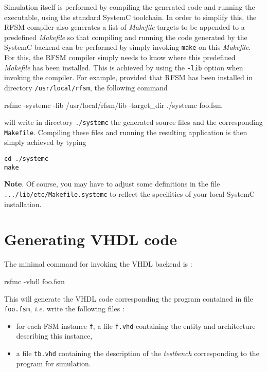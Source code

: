 Simulation itself is performed by compiling the generated code and running the executable,
using the standard SystemC toolchain.
In order to simplify this, the RFSM compiler also generates a list of \emph{Makefile} targets to be
appended to a predefined \emph{Makefile} so that compiling and running the code generated by the
SystemC backend can be performed by simply invoking \verb|make| on this \emph{Makefile}. For this,
the RFSM compiler simply needs to know where this predefined \emph{Makefile} has been
installed. This is achieved by using the \verb|-lib| option when invoking the compiler. For example,
provided that RFSM has been installed in directory \verb|/usr/local/rfsm|, the following command

\begin{FVerbatim}
rsfmc -systemc -lib /usr/local/rfsm/lib -target_dir ./systemc  foo.fsm  
\end{FVerbatim}

will write in directory \verb|./systemc| the generated source files and the corresponding
\verb|Makefile|. Compiling these files and running the resulting application is then simply achieved
by typing

\begin{verbatim}
cd ./systemc
make 
\end{verbatim}

\medskip
\textbf{Note}. Of course, you may have to adjust some definitions in the file
\verb|.../lib/etc/Makefile.systemc| to reflect the specifities of your local SystemC installation. 

\section{Generating VHDL code}
\label{sec:generating-vhdl-code}

The minimal command for invoking the VHDL backend is :

\begin{FVerbatim}
rsfmc -vhdl foo.fsm  
\end{FVerbatim}

This will  generate the VHDL code corresponding the program contained in file
\texttt{foo.fsm}, \emph{i.e.} write the following files :

\begin{itemize}
\item for each FSM instance \verb|f|, a file \verb|f.vhd| containing the
  entity and architecture describing this instance,
\item a file \verb|tb.vhd| containing the description of the \emph{testbench} corresponding to the
  program for simulation.
\end{itemize}

